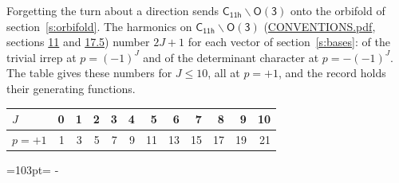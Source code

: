 \documentclass[10pt,a4paper]{article}
\newcommand{\needspace}[1]{\par\penalty-100\begingroup\dimen0=#1\relax\dimen2=\pagegoal
  \advance\dimen2-\pagetotal\ifdim\dimen0>\dimen2\relax\ifdim\dimen2>0pt\vfil\break\fi\fi
  \endgroup}
\numberwithin{equation}{section}
\newcommand{\grp}[1]{\mathsf{#1}}
\begin{document}
Forgetting the turn about a direction sends $\grp{C_{11h}}\backslash\grp{O(3)}$ onto the orbifold of section~\ref{s:orbifold}.
The harmonics on $\grp{C_{11h}}\backslash\grp{O(3)}$ (\href{../../CONVENTIONS.pdf}{CONVENTIONS.pdf}, sections \href{../../CONVENTIONS.pdf\#conv.11}{11} and \href{../../CONVENTIONS.pdf\#conv.17.5}{17.5}) number $2J + 1$ for each vector of section~\ref{s:bases}: of the trivial irrep at $p = (-1)^J$ and of the determinant character at $p = -(-1)^J$. The table gives these numbers for $J \le 10$, all at $p = +1$, and the record holds their generating functions.
{\small\setlength{\tabcolsep}{4pt}\begin{longtable}{@{}lrrrrrrrrrrr@{}}\toprule
$J$ & 0 & 1 & 2 & 3 & 4 & 5 & 6 & 7 & 8 & 9 & 10\\\midrule\endhead
\bottomrule\endfoot\endlastfoot
$p = +1$ & 1 & 3 & 5 & 7 & 9 & 11 & 13 & 15 & 17 & 19 & 21\\
\bottomrule\end{longtable}}
\needspace{103pt}
\end{document}
